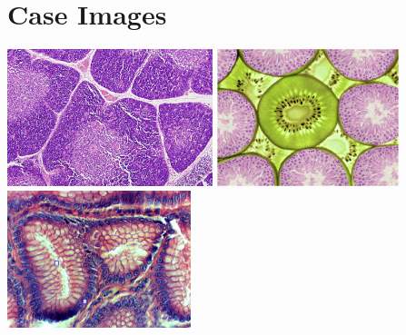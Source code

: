 \documentclass[12pt,a4paper]{article}\usepackage[]{graphicx}\usepackage[]{color}
\begin{document}
\section*{Case Images}
\includegraphics[height=4cm,keepaspectratio]{figures/histology/athymus2.jpg}
\includegraphics[height=4cm,keepaspectratio]{figures/histology/bhistolokiwi.jpg}
\includegraphics[height=4cm,keepaspectratio]{figures/histology/SimpleColumnarEpithelium1_0.jpg}

\end{document}
